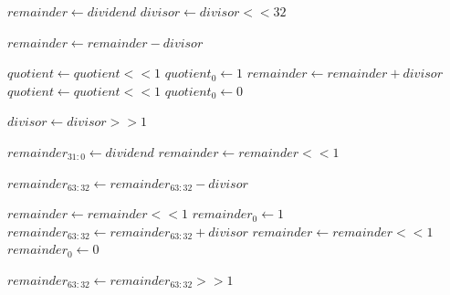 \documentclass[11pt]{article}
\begin{document}
\begin{algorithm}[hbt!]
\caption{A Binary Integer Division Algorithm}\label{alg:div1}
\begin{algorithmic}

\State $remainder \gets dividend$
\State $divisor \gets divisor << 32$

    \State $remainder \gets remainder - divisor$
    
        \State $quotient \gets quotient << 1$
        \State $quotient_{0} \gets 1$
    \Else
        \State $remainder \gets remainder + divisor$
        \State $quotient \gets quotient << 1$
        \State $quotient_{0} \gets 0$    
    \EndIf
    
    \State $divisor \gets divisor >> 1$
\EndFor

\end{algorithmic}
\end{algorithm}

\pagebreak

\begin{algorithm}[hbt!]
\caption{An Improved Binary Integer Division Algorithm Using a 32-bit ALU, Using the Right Half of the Remainder as the Dividend, and Placing the Remainder in the Left Half of the Reminader Register, and the Quotient in the Right Half of the Remainder Register}\label{alg:div1}
\begin{algorithmic}

\State $remainder_{31:0} \gets dividend$
\State $remainder \gets remainder << 1$

    \State $remainder_{63:32} \gets remainder_{63:32} - divisor$
    
        \State $remainder \gets remainder << 1$
        \State $remainder_{0} \gets 1$
    \Else
        \State $remainder_{63:32} \gets remainder_{63:32} + divisor$
        \State $remainder \gets remainder << 1$
        \State $remainder_{0} \gets 0$    
    \EndIf
\EndFor

\State $remainder_{63:32} \gets remainder_{63:32} >> 1$

\end{algorithmic}
\end{algorithm}
\end{document}
